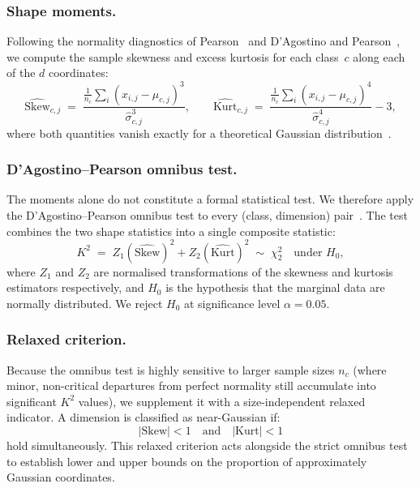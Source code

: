\subsubsection{Shape moments.}
Following the normality diagnostics of Pearson~\cite{pearson1895skewness} and D'Agostino and Pearson~\cite{dagostino1971omnibus,dagostino1973tests}, we compute the sample skewness and excess kurtosis for each class~$c$ along each of the $d$ coordinates:
\begin{equation}
	\widehat{\mathrm{Skew}}_{c,j} \;=\; \frac{\frac{1}{n_c}\sum_{i}(x_{i,j}-\mu_{c,j})^3}{\hat\sigma_{c,j}^{3}},\qquad
	\widehat{\mathrm{Kurt}}_{c,j} \;=\; \frac{\frac{1}{n_c}\sum_{i}(x_{i,j}-\mu_{c,j})^4}{\hat\sigma_{c,j}^{4}} - 3,
	\label{eq:moments}
\end{equation}
where both quantities vanish exactly for a theoretical Gaussian distribution~\cite{pearson1895skewness,joyce2011kurtosis}.

\subsubsection{D'Agostino--Pearson omnibus test.}
The moments alone do not constitute a formal statistical test. We therefore apply the D'Agostino--Pearson omnibus test to every (class, dimension) pair~\cite{dagostino1971omnibus,dagostino1973tests}. The test combines the two shape statistics into a single composite statistic:
\begin{equation}
	K^2 \;=\; Z_1\!\left(\widehat{\mathrm{Skew}}\right)^2 + Z_2\!\left(\widehat{\mathrm{Kurt}}\right)^2 \;\sim\; \chi^2_2 \quad \text{under } H_0,
	\label{eq:normaltest}
\end{equation}
where $Z_1$ and $Z_2$ are normalised transformations of the skewness and kurtosis estimators respectively, and $H_0$ is the hypothesis that the marginal data are normally distributed. We reject $H_0$ at significance level $\alpha=0.05$.

\subsubsection{Relaxed criterion.}
Because the omnibus test is highly sensitive to larger sample sizes $n_c$ (where minor, non-critical departures from perfect normality still accumulate into significant $K^2$ values), we supplement it with a size-independent relaxed indicator. A dimension is classified as near-Gaussian if:
\begin{equation}
	|\mathrm{Skew}| < 1 \quad \text{and} \quad |\mathrm{Kurt}| < 1
\end{equation}
hold simultaneously. This relaxed criterion acts alongside the strict omnibus test to establish lower and upper bounds on the proportion of approximately Gaussian coordinates.



